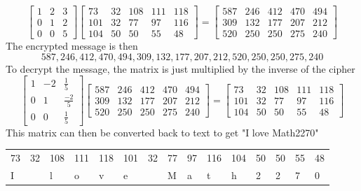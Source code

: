 \documentclass{../mathhomework}
\begin{document}
\begin{equation*}
    \begin{bmatrix}
        1 & 2 & 3 \\
        0 & 1 & 2 \\
        0 & 0 & 5
    \end{bmatrix}
    \begin{bmatrix}
        73 & 32 & 108 & 111 & 118 \\ 
        101 & 32 & 77 & 97 & 116 \\ 
        104 & 50 & 50 & 55 & 48
    \end{bmatrix} = \begin{bmatrix}
        587 & 246 & 412 & 470 & 494 \\
        309 & 132 & 177 & 207 & 212 \\
        520 & 250 & 250 & 275 & 240
    \end{bmatrix}
\end{equation*}
The encrypted message is then
\begin{equation*}
    587, 246, 412, 470, 494, 309, 132, 177, 207, 212, 520, 250, 250, 275, 240
\end{equation*}
To decrypt the message, the matrix is just multiplied by the inverse of the cipher
\begin{equation*}
    \begin{bmatrix}
        1 & -2 & \frac{1}{5} \\ 
        0 & 1 & \frac{-2}{5} \\
        0 & 0 & \frac{1}{5}
    \end{bmatrix}
    \begin{bmatrix}
        587 & 246 & 412 & 470 & 494 \\
        309 & 132 & 177 & 207 & 212 \\
        520 & 250 & 250 & 275 & 240
    \end{bmatrix} =
    \begin{bmatrix}
        73 & 32 & 108 & 111 & 118 \\ 
        101 & 32 & 77 & 97 & 116 \\ 
        104 & 50 & 50 & 55 & 48
    \end{bmatrix}
\end{equation*}
This matrix can then be converted back to text to get "I love Math2270"
\begin{table}[H]
    \begin{tabular}{lllllllllllllll}
        73 & 32 & 108 & 111 & 118 & 101 & 32 & 77 & 97 & 116 & 104 & 50 & 50 & 55 & 48 \\
        I  &    & l   & o   & v   & e   &    & M  & a  & t   & h   & 2  & 2  & 7  & 0 
    \end{tabular}
\end{table}
\pagebreak



\end{document}
